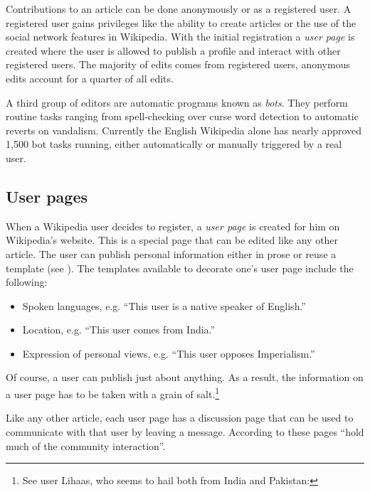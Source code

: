 Contributions to an article can be done anonymously or as a registered user.
A registered user gains privileges like the ability to create articles or the use of the social network features in Wikipedia.
With the initial registration a \emph{user page} is created where the user is allowed to publish a profile and interact with other registered users.\cite{wikiwhyaccount}
The majority of edits comes from registered users, anonymous edits account for a quarter of all edits.\cite{wpanonstats}

A third group of editors are automatic programs known as \emph{bots}.
They perform routine tasks ranging from spell-checking over curse word detection to automatic reverts on vandalism.
Currently the English Wikipedia alone has nearly approved 1,500 bot tasks running, either automatically or manually triggered by a real user.\cite{wpbots}

\subsection{User pages}\label{sub:userpages}

When a Wikipedia user decides to register, a \emph{user page} is created for him on Wikipedia's website. 
This is a special page that can be edited like any other article.
The user can publish personal information either in prose or reuse a template (see ).
The templates available to decorate one's user page include the following: 
\begin{itemize}
  \item Spoken languages, e.g. ``This user is a native speaker of English.''
  \item Location, e.g. ``This user comes from India.''
  \item Expression of personal views, e.g. ``This user opposes Imperialism.''
\end{itemize}
Of course, a user can publish just about anything.
As a result, the information on a user page has to be taken with a grain of salt.\footnote{See user Lihaas, who seems to hail both from India and Pakistan: }

Like any other article, each user page has a discussion page that can be used to communicate with that user by leaving a message.
According to \textcite{Viegas2007talk} these pages ``hold much of the community interaction''.


